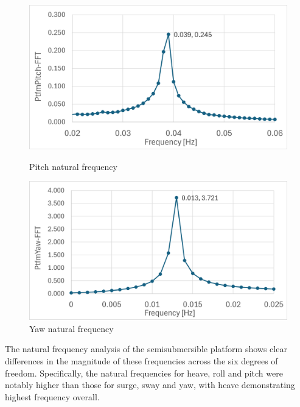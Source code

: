 \documentclass[a4paper, 11pt]{article}
\begin{document}
\begin{figure}[H]
    \begin{minipage}{0.49\textwidth}
        \centering
        \includegraphics[width=1\textwidth]{nat_freq_pitch.png}
        \caption{\small Pitch natural frequency}
        \label{fig:nat_freq_pitch}
    \end{minipage}
    \hfill
    \begin{minipage}{0.5\textwidth}
        \centering
        \includegraphics[width=1\textwidth]{nat_freq_yaw.png}
        \caption{\small Yaw natural frequency}
        \label{fig:nat_freq_yaw}
    \end{minipage}
\end{figure}

The natural frequency analysis of the semisubmersible platform shows clear differences in the magnitude of these frequencies across the six degrees of freedom. Specifically, the natural frequencies for heave, roll and pitch were notably higher than those for surge, sway and yaw, with heave demonstrating highest frequency overall.
\end{document}
